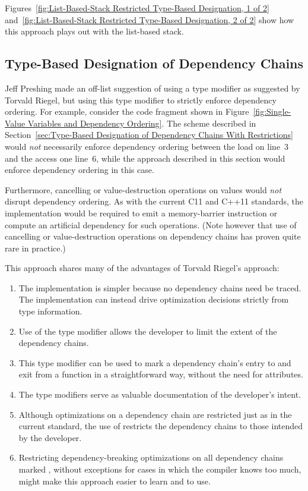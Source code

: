 \documentclass[letterpaper,twocolumn,10pt]{article}
\begin{document}
Figures~\ref{fig:List-Based-Stack Restricted Type-Based Designation, 1 of 2}
and~\ref{fig:List-Based-Stack Restricted Type-Based Designation, 2 of 2}
show how this approach plays out with the list-based stack.

\subsection{Type-Based Designation of Dependency Chains}
\label{sec:Type-Based Designation of Dependency Chains}

Jeff Preshing made an off-list suggestion of using a
 type modifier as suggested by Torvald Riegel,
but using this type modifier to strictly enforce dependency ordering.
For example, consider the code fragment shown in
Figure~\ref{fig:Single-Value Variables and Dependency Ordering}.
The scheme described in
Section~\ref{sec:Type-Based Designation of Dependency Chains With Restrictions}
would \emph{not} necessarily enforce dependency ordering between the
load on line~3 and the access one line~6, while the approach described
in this section would enforce dependency ordering in this case.

Furthermore, cancelling or value-destruction operations on
 values would \emph{not} disrupt dependency
ordering.
As with the current C11 and C++11 standards, the implementation would be
required to emit a memory-barrier instruction or compute an artificial
dependency for such operations.
(Note however that use of cancelling or value-destruction operations
on dependency chains has proven quite rare in practice.)

This approach shares many of the advantages of Torvald Riegel's approach:

\begin{enumerate}
\item	The implementation is simpler because no dependency chains
	need be traced.
	The implementation can instead drive optimization decisions
	strictly from type information.
\item	Use of the  type modifier allows
	the developer to limit the extent of the dependency chains.
\item	This type modifier can be used to mark a dependency chain's
	entry to and exit from a function in a straightforward way,
	without the need for attributes.
\item	The  type modifiers serve as
	valuable documentation of the developer's intent.
\item	Although optimizations on a dependency chain are restricted
	just as in the current standard, the use of 
	restricts the dependency chains to those intended by the
	developer.
\item	Restricting dependency-breaking optimizations on all dependency
	chains marked , without exceptions for
	cases in which the compiler knows too much, might make this approach
	easier to learn and to use.
\end{enumerate}
\end{document}
